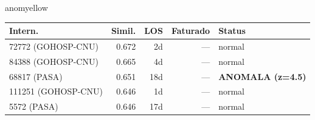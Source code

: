 \documentclass[a4paper,10pt]{article}
\begin{document}
\begin{anomalycard}[Internacao 162805 | GHO-PETROBRAS | MODERADO (z=2.45)]{anomyellow}
\begin{tabular}{l r r r l}\toprule\textbf{Intern.} & \textbf{Simil.} & \textbf{LOS} & \textbf{Faturado} & \textbf{Status} \\\midrule
72772 (GOHOSP-CNU) & 0.672 & 2d & --- & \textcolor{jcubeblue}{normal} \\
84388 (GOHOSP-CNU) & 0.665 & 4d & --- & \textcolor{jcubeblue}{normal} \\
68817 (PASA) & 0.651 & 18d & --- & \textcolor{anomred}{\textbf{ANOMALA (z=4.5)}} \\
111251 (GOHOSP-CNU) & 0.646 & 1d & --- & \textcolor{jcubeblue}{normal} \\
5572 (PASA) & 0.646 & 17d & --- & \textcolor{jcubeblue}{normal} \\
\bottomrule\end{tabular}


\end{anomalycard}

\newpage
\end{document}
